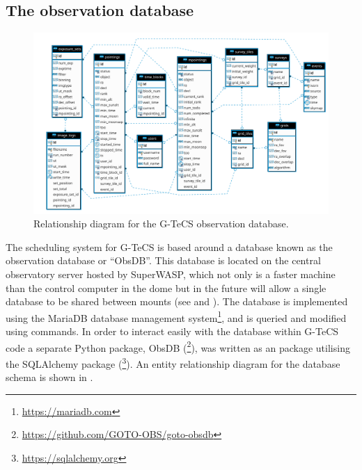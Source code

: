\subsection{The observation database}
\label{sec:obsdb}
\begin{colsection}

\begin{figure}
    \begin{center}
        \includegraphics[width=\linewidth]{images/schema.pdf}
    \end{center}
    \caption[Relationship diagram for the G-TeCS observation database]{
        Relationship diagram for the G-TeCS observation database.
    }\label{fig:schema}
\end{figure}

The scheduling system for G-TeCS is based around a database known as the observation database or ``ObsDB''. This database is located on the central observatory server hosted by SuperWASP, which not only is a faster machine than the control computer in the dome but in the future will allow a single database to be shared between mounts (see  and ). The database is implemented using the MariaDB database management system\footnote{\url{https://mariadb.com}}, and is queried and modified using  commands. In order to interact easily with the database within G-TeCS code a separate Python package, ObsDB (\footnote{\url{https://github.com/GOTO-OBS/goto-obsdb}}), was written as an  package utilising the SQLAlchemy package (\footnote{\url{https://sqlalchemy.org}}). An entity relationship diagram for the database schema is shown in .


\end{colsection}
